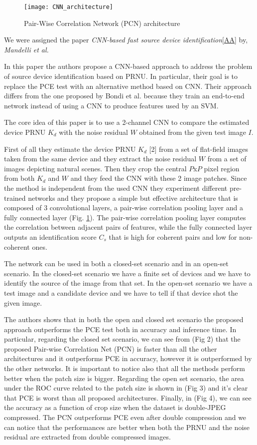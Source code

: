 \begin{figure}[t!]
    \centering
    \texttt{[image: CNN\_architecture]}
    \caption{Pair-Wise Correlation Network (PCN) architecture}
    \label{fig:CNN_architecture}
\end{figure}

We were assigned the paper \textit{CNN-based fast source device identification}\ref{AA} by, \textit{Mandelli et al.}

In this paper the authors propose a CNN-based approach to address the problem of source device identification based on PRNU. 
In particular, their goal is to replace the PCE test with an alternative method based on CNN. Their approach differs from the one
proposed by Bondi et al. because they train an end-to-end network instead of using a CNN to produce features used by an SVM.

The core idea of this paper is to use a 2-channel CNN to compare the estimated device PRNU $K_d$ with the noise residual $W$ 
obtained from the given test image $I$.

First of all they estimate the device PRNU $K_d$ [2] from a set of flat-field images taken from the same device and they extract the
noise residual $W$ from a set of images depicting natural scenes.
Then they crop the central $P$x$P$ pixel region from both $K_d$ and $W$ and they feed the CNN with these 2 image patches.
Since the method is independent from the used CNN they experiment different pre-trained networks and they propose a simple but 
effective architecture that is composed of 3 convolutional layers, a pair-wise correlation pooling layer and a fully connected 
layer (Fig. \ref{fig:CNN_architecture}). The pair-wise correlation pooling layer computes the correlation between adjacent pairs of features, while the
fully connected layer outputs an identification score $C_s$ that is high for coherent pairs and low for non-coherent ones. 

The network can be used in both a closed-set scenario and in an open-set scenario. In the closed-set scenario we have a finite set 
of devices and we have to identify the source of the image from that set. In the open-set scenario we have a test image and a candidate
device and we have to tell if that device shot the given image.

The authors shows that in both the open and closed set scenario the proposed approach outperforms the PCE test both in accuracy 
and inference time. In particular, regarding the closed set scenario, we can see from (Fig 2) that the proposed Pair-wise Correlation Net (PCN) is faster than all the 
other architectures and it outperforms PCE in accuracy, however it is outperformed by the other networks. It is important to notice 
also that all the methods perform better when the patch size is bigger.
Regarding the open set scenario, the area under the ROC curve related to the patch size is shown in (Fig 3) and it's clear that 
PCE is worst than all proposed architectures. 
Finally, in (Fig 4), we can see the accuracy as a function of crop size when the dataset is double-JPEG compressed. The PCN outperforms
PCE even after double compression and we can notice that the performances are better when both the PRNU and the noise residual are 
extracted from double compressed images.
